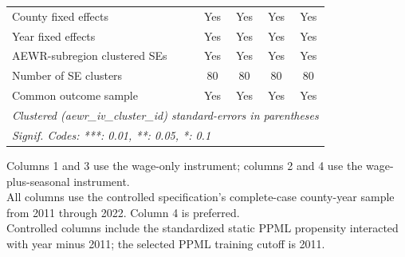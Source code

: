 \begin{table}[htbp]
\begin{tabular}{lcccc}
      County fixed effects                 & Yes           & Yes          & Yes                  & Yes\\  
      Year fixed effects                   & Yes           & Yes          & Yes                  & Yes\\  
      AEWR-subregion clustered SEs         & Yes           & Yes          & Yes                  & Yes\\  
      Number of SE clusters                & 80            & 80           & 80                   & 80\\  
      Common outcome sample                & Yes           & Yes          & Yes                  & Yes\\  
      \midrule \midrule
      \multicolumn{5}{l}{\emph{Clustered (aewr\_iv\_cluster\_id) standard-errors in parentheses}}\\
      \multicolumn{5}{l}{\emph{Signif. Codes: ***: 0.01, **: 0.05, *: 0.1}}\\
   \end{tabular}
   
   \par \raggedright 
   Columns 1 and 3 use the wage-only instrument; columns 2 and 4 use the wage-plus-seasonal instrument.\\
   All columns use the controlled specification's complete-case county-year sample from 2011 through 2022. Column 4 is preferred.\\
   Controlled columns include the standardized static PPML propensity interacted with year minus 2011; the selected PPML training cutoff is 2011.
\end{table}


